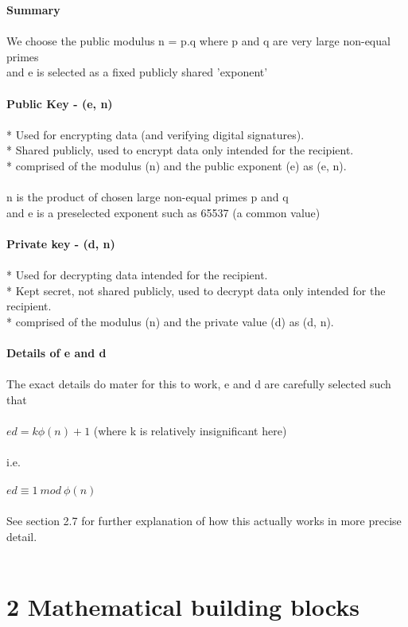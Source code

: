 \documentclass[11pt]{article}   	%
\begin{document}
\textbf{Summary} \\
\\
We choose the public modulus n = p.q where p and q are very large non-equal primes \\
and e is selected as a fixed publicly shared 'exponent' \\
\\
\textbf{Public Key - (e, n)} \\
\\
    * Used for encrypting data (and verifying digital signatures). \\
    * Shared publicly, used to encrypt data only intended for the recipient. \\
    * comprised of the modulus (n) and the public exponent (e) as (e, n). \\
\\
n is the product of chosen large non-equal primes p and q \\
and e is a preselected exponent such as 65537 (a common value) \\
\\
\textbf{Private key - (d, n)} \\
\\
    * Used for decrypting data intended for the recipient. \\
    * Kept secret, not shared publicly, used to decrypt data only intended for the recipient. \\
    * comprised of the modulus (n) and the private value (d) as (d, n). \\
\\
\textbf{Details of e and d} \\
\\
The exact details do mater for this to work, e and d are carefully selected such that \\
\\
$ ed = k\phi(n) + 1 $ (where k is relatively insignificant here) \\
\\
i.e. \\
\\
$ ed \equiv 1 \  mod \ \phi(n) $ \\
\\
See section 2.7 for further explanation of how this actually works in more precise detail. \\
\\

\break 


\section*{2 Mathematical building blocks}
\end{document}

